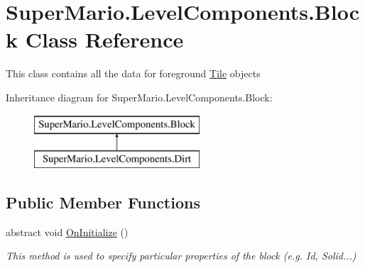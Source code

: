 \hypertarget{class_super_mario_1_1_level_components_1_1_block}{}\section{Super\+Mario.\+Level\+Components.\+Block Class Reference}
\label{class_super_mario_1_1_level_components_1_1_block}


This class contains all the data for foreground \mbox{\hyperlink{class_super_mario_1_1_tile}{Tile}} objects  


Inheritance diagram for Super\+Mario.\+Level\+Components.\+Block\+:\begin{figure}[H]
\begin{center}
\leavevmode
\includegraphics[height=2.000000cm]{class_super_mario_1_1_level_components_1_1_block}
\end{center}
\end{figure}
\subsection*{Public Member Functions}
\begin{DoxyCompactItemize}
\item 
abstract void \mbox{\hyperlink{class_super_mario_1_1_level_components_1_1_block_aecd2a6fa80ecbd7dd5cec2cdf4b149ec}{On\+Initialize}} ()
\begin{DoxyCompactList}\small\item\em This method is used to specify particular properties of the block (e.\+g. Id, Solid...) \end{DoxyCompactList}\end{DoxyCompactItemize}
